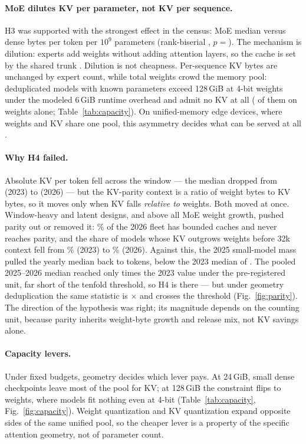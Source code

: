\paragraph{MoE dilutes KV per parameter, not KV per sequence.}
H3 was supported with the strongest effect in the census: MoE median
\kvcMedKvppMoe{} versus dense \kvcMedKvppDense{} bytes per token per $10^9$
parameters (rank-biserial \kvcMoeRB, $p=$\kvcMoeP). The mechanism is dilution:
experts add weights without adding attention layers, so the cache is set by the
shared trunk \cite{jiang2024mixtral,deepseekai2024v2}. Dilution is not
cheapness. Per-sequence KV bytes are unchanged by expert count, while total
weights crowd the memory pool: \kvcInfeasibleBigModels{} deduplicated models with known parameters exceed
128\,GiB at 4-bit weights under the modeled 6\,GiB runtime overhead and admit no KV at
all (\kvcWeightsAloneBig{} of them on weights alone; Table~\ref{tab:capacity}). On
unified-memory edge devices, where weights and KV share one pool, this asymmetry
decides what can be served at all \cite{rajesh2025edgemem}.

\paragraph{Why H4 failed.}
Absolute KV per token fell across the window --- the median dropped from
\kvcMedianKvTokTwentyThree{} (2023) to \kvcMedianKvTokTwentySix{} (2026) --- but
the KV-parity context is a ratio of weight bytes to KV bytes, so it moves only
when KV falls \emph{relative to} weights. Both moved at once. Window-heavy and
latent designs, and above all MoE weight growth, pushed parity out or removed
it: \kvcParityInfShareTwentySix\% of the 2026 fleet has bounded caches and never
reaches parity, and the share of models whose KV outgrows weights before 32k
context fell from \kvcDominantShareTwentyThree\% (2023) to
\kvcDominantShareTwentySix\% (2026). Against this, the 2025 small-model mass
pulled the yearly median back to \kvcParityMedTwentyFive{} tokens, below the
2023 median of \kvcParityMedTwentyThree{}. The pooled 2025--2026 median reached
only \kvcHFourRatio{} times the 2023 value under the pre-registered unit, far short of
the tenfold threshold, so H4 is \kvcHFourVerdict{} there --- but under geometry
deduplication the same statistic is \kvcHFourRatioGeo$\times$ and crosses the
threshold (Fig.~\ref{fig:parity}). The direction of the hypothesis was right; its
magnitude depends on the counting unit, because parity inherits weight-byte growth and
release mix, not KV savings alone.

\paragraph{Capacity levers.}
Under fixed budgets, geometry decides which lever pays. At 24\,GiB, small dense
checkpoints leave most of the pool for KV; at 128\,GiB the constraint flips to
weights, where \kvcInfeasibleBigModels{} models fit nothing even at 4-bit
(Table~\ref{tab:capacity}, Fig.~\ref{fig:capacity}). Weight quantization
\cite{frantar2022gptq,dettmers2022int8} and KV quantization
\cite{liu2024kivi,hooper2024kvquant} expand opposite sides of the same unified
pool, so the cheaper lever is a property of the specific attention geometry,
not of parameter count.
